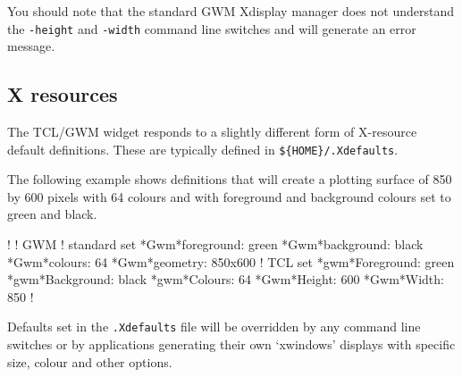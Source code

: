 \documentclass[twoside,11pt,nolof]{starlink}
\begin{document}
You should note that the standard GWM Xdisplay manager does not understand the
{\texttt{-height}} and {\texttt{-width}} command line switches and will generate an
error message.

\subsection{\label{x_resources}X resources}

The TCL/GWM widget responds to a slightly different form of X-resource
default definitions.  These are typically defined in
{\verb+${HOME}/.Xdefaults+}.

The following example shows definitions that will create a plotting
surface of 850 by 600 pixels with 64 colours and with foreground and
background colours set to green and black.

\begin{terminalv}
!
! GWM
!   standard set
*Gwm*foreground: green
*Gwm*background: black
*Gwm*colours: 64
*Gwm*geometry: 850x600
!   TCL set
*gwm*Foreground: green
*gwm*Background: black
*gwm*Colours: 64
*Gwm*Height: 600
*Gwm*Width: 850
!
\end{terminalv}

Defaults set in the {\texttt{.Xdefaults}} file will be overridden by any
command line switches or by applications generating their own `xwindows'
displays with specific size, colour and other options.
\end{document}
